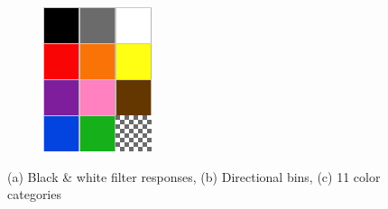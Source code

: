 \documentclass[runningheads]{llncs}
\begin{document}
\begin{figure}[t!]
\begin{subfigure}[t]{0.3\textwidth}
\caption{} \label{fig:motion}
\end{subfigure}
\begin{subfigure}[t]{0.2\textwidth}
\includegraphics[width=\textwidth]{Images/colorspal.png}
\caption{} \label{fig:colorPal}
\end{subfigure}
\caption{(a) Black \& white filter responses, (b) Directional bins, (c) 11 color categories \protect\cite{berlinandkay}} \label{fig:bW_motion}
\end{figure}

 
\end{document}
